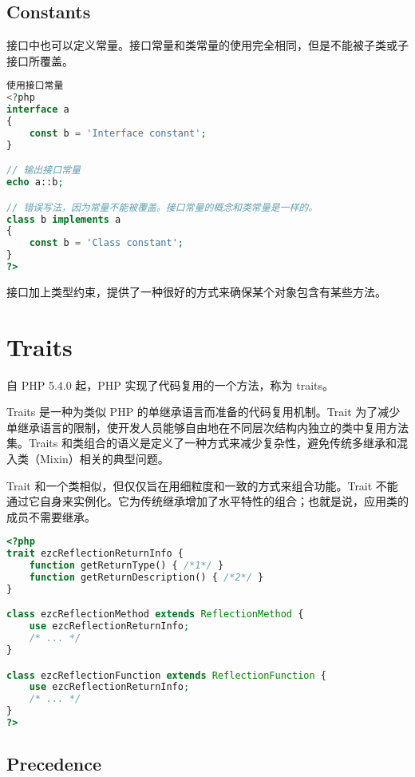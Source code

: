 \section{Constants}


接口中也可以定义常量。接口常量和类常量的使用完全相同，但是不能被子类或子接口所覆盖。







\begin{lstlisting}[language=PHP]
使用接口常量
<?php
interface a
{
    const b = 'Interface constant';
}

// 输出接口常量
echo a::b;

// 错误写法，因为常量不能被覆盖。接口常量的概念和类常量是一样的。
class b implements a
{
    const b = 'Class constant';
}
?>
\end{lstlisting}


接口加上类型约束，提供了一种很好的方式来确保某个对象包含有某些方法。


\chapter{Traits}


自 PHP 5.4.0 起，PHP 实现了代码复用的一个方法，称为 traits。

Traits 是一种为类似 PHP 的单继承语言而准备的代码复用机制。Trait 为了减少单继承语言的限制，使开发人员能够自由地在不同层次结构内独立的类中复用方法集。Traits 和类组合的语义是定义了一种方式来减少复杂性，避免传统多继承和混入类（Mixin）相关的典型问题。

Trait 和一个类相似，但仅仅旨在用细粒度和一致的方式来组合功能。Trait 不能通过它自身来实例化。它为传统继承增加了水平特性的组合；也就是说，应用类的成员不需要继承。

\begin{lstlisting}[language=PHP]
<?php
trait ezcReflectionReturnInfo {
    function getReturnType() { /*1*/ }
    function getReturnDescription() { /*2*/ }
}

class ezcReflectionMethod extends ReflectionMethod {
    use ezcReflectionReturnInfo;
    /* ... */
}

class ezcReflectionFunction extends ReflectionFunction {
    use ezcReflectionReturnInfo;
    /* ... */
}
?>
\end{lstlisting}


\section{Precedence}

